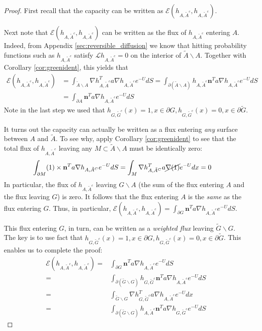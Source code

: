 \documentclass[english, aip, jcp, priprint, graphicx,floatfix]{revtex4-1}
\theoremstyle{plain}
\theoremstyle{definition}
\theoremstyle{plain}
\begin{document}
\begin{proof}
First recall that the capacity can be written as $\mathscr{E}(h_{A,\tilde A^c},h_{A,\tilde A^c})$.

Next note that $\mathscr{E}(h_{A,\tilde A^c},h_{A,\tilde A^c}) $ can be written as the flux of $h_{A,\tilde A^c}$ entering $A$.  Indeed, from Appendix \ref{sec:reversible_diffusion} we know that hitting probability functions such as $h_{A,\tilde A^c}$ satisfy $\mathcal Lh_{A,\tilde A^c}=0$ on the interior of $\tilde A \backslash A$.  Together with Corollary \ref{cor:greenident}, this yields that 
\begin{align*}
\mathscr{E}(h_{A,\tilde A^c},h_{A,\tilde A^c}) 
    &= \int_{\tilde A \backslash A}  \nabla h_{A, \tilde{A}^c}^T a  \nabla h_{A, \tilde{A}^c} e^{- U } dS 
    = \int_{\partial (\tilde A \backslash A)}  h_{A, \tilde{A}^c} \textbf{n}^T a  \nabla h_{A, \tilde{A}^c} e^{- U } dS \\
    &= \int_{\partial A}  \textbf{n}^T a  \nabla h_{A, \tilde{A}^c} e^{- U } dS
\end{align*}
Note in the last step we used that $h_{G,\tilde G^c}(x)=1,x\in \partial G,h_{G,\tilde G^c}(x)=0,x\in \partial \tilde G$.  

It turns out the capacity can actually be written as a flux entering \emph{any} surface between $A$ and $\tilde A$.  To see why, apply Corollary \ref{cor:greenident} to see that the total flux of $h_{A,\tilde A^c}$ leaving any $M\subset \tilde A \backslash A$ must be identically zero:
\begin{align*}
\int_{\partial M} (1) \times \textbf{n}^T a  \nabla h_{A,\tilde A^C} e^{- U } dS
    &= \int_{M} \nabla h_{A,\tilde A^C}^T  a  \cancel{\nabla (1)} e^{- U } dx=0
\end{align*}
In particular, the flux of $h_{A,\tilde A^c}$ leaving $G \backslash A$ (the sum of the flux entering $A$ and the flux leaving $G$) is zero.  It follows that the flux entering $A$ is the \emph{same} as the flux entering $G$.  Thus, in particular, $\mathscr{E}(h_{A,\tilde A^c},h_{A,\tilde A^c}) = \int_{\partial G}  \textbf{n}^T a  \nabla h_{A, \tilde{A}^c} e^{- U } dS$.  

This flux entering $G$, in turn, can be written as a \emph{weighted flux} leaving $\tilde G \backslash G$.  The key is to use fact that $h_{G,\tilde G^c}(x)=1,x\in \partial G,h_{G,\tilde G^c}(x)=0,x\in \partial \tilde G$.  This enables us to complete the proof:
\begin{align*}
\mathscr{E}(h_{A,\tilde A^c},h_{A,\tilde A^c})
    =&\int_{\partial G}  \textbf{n}^T a  \nabla h_{A, \tilde{A}^c} e^{- U } dS\\
    =& \int_{\partial (\tilde G \backslash G)}  h_{G, \tilde{G}^c}    \textbf{n}^T a  \nabla h_{A, \tilde{A}^c} e^{- U } dS\\
    =& \int_{\tilde G \backslash G}  \nabla h_{G, \tilde{G}^c}^T a  \nabla h_{A, \tilde{A}^c} e^{- U } dx\\
    =&\int_{\partial (\tilde G \backslash G)}  h_{A, \tilde{A}^c}    \textbf{n}^T a  \nabla h_{G, \tilde{G}^c} e^{- U } dS
\end{align*}
\end{proof}
\end{document}
